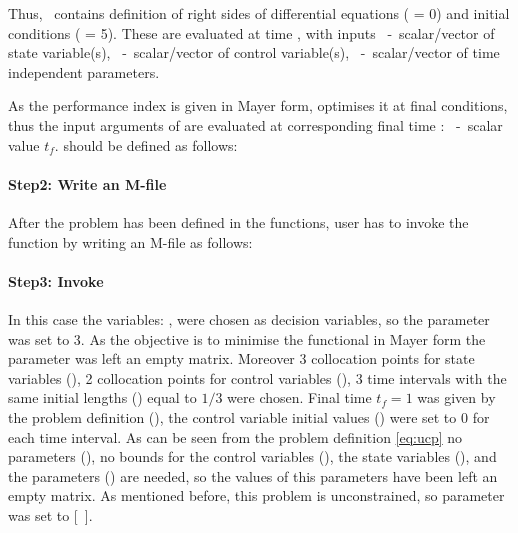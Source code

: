 {\small }

Thus,~ contains definition of right sides of
differential equations ( = 0) and initial conditions
( = 5). These are evaluated at time , with
inputs ~-~scalar/vector of state variable(s),
~-~scalar/vector of control variable(s),
~-~scalar/vector of time independent parameters.

As the performance index is given in Mayer form, 
optimises it at final conditions, thus the input arguments of
 are evaluated at corresponding final time :
~-~scalar value $t_{f}$.  should be defined as
follows:

\paragraph{Step2: Write an M-file~}

{\small }

After the problem has been defined in the functions, user has to invoke
the  function by writing an M-file  as
follows:

\paragraph{Step3: Invoke~}

{\small }

In this case the variables: ,  were chosen as
decision variables, so the parameter  was
set to 3. As the objective is to minimise the functional in Mayer form
the parameter  was left an empty
matrix. Moreover 3 collocation points for state variables
(), 2 collocation points for control
variables (), 3 time intervals with the same
initial lengths () equal to $1/3$ were
chosen. Final time $t_f = 1$ was given by the problem definition
(), the control variable initial values
() were set to 0 for each time interval. As can
be seen from the problem definition \eqref{eq:ucp} no parameters
(), no bounds for the control variables 
(), the state variables (),
and the parameters () are needed, so the values
of this parameters have been left an empty matrix. As mentioned before,
this problem is unconstrained, so parameter 
was set to [~].


